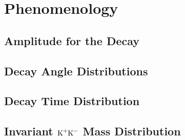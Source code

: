 \chapter{Phenomenology}


\section{Amplitude for the \BstoJpsiKK{} Decay}
\section{Decay Angle Distributions}
\section{Decay Time Distribution}
\section{Invariant $\text{K}^+\text{K}^-$ Mass Distribution}
